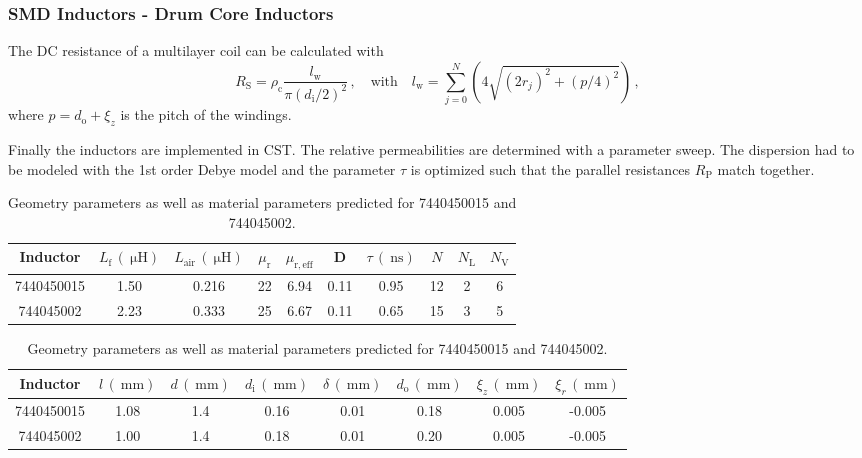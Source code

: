 \begin{frame}
	\frametitle{SMD Inductors - Drum Core Inductors}
	The DC resistance of a multilayer coil can be calculated with
	\begin{equation} \label{eqn:multilayer_eqn4}
		R_\mathrm{S} = \rho_\mathrm{c}\frac{l_\mathrm{w}}{\pi(d_\mathrm{i}/2)^2}\,, 
		\quad \text{with} \quad
		l_\mathrm{w} = \sum_{j=0}^{N}\left(4\sqrt{(2r_j)^2+(p/4)^2}\right)\,,
	\end{equation}
	where $p = d_\mathrm{o}+\xi_z$ is the pitch of the windings.
	
	Finally the inductors are implemented in CST. The relative permeabilities are determined with a parameter sweep. The dispersion had to be modeled with the 1st order Debye model and the parameter $\tau$ is optimized such that the parallel resistances $R_\mathrm{P}$ match together.
	\vspace{-15pt}
	\begin{table}[ptbh]
		\centering
		\begin{tabular}{|c|c c c c c c c c c|}
			\hline
			Inductor & $L_\mathrm{f}\,(\SI{}{\micro\henry})$ & $L_{\mathrm{air}}\,(\SI{}{\micro\henry})$ & $\mu_\mathrm{r}$ & $\mu_\mathrm{r,eff}$ & D & $\tau\,(\SI{}{\nano\second})$ & $N$ & $N_\mathrm{L}$ & $N_\mathrm{V}$\\
			\hline
			7440450015 & 1.50 & 0.216 & 22 & 6.94 & 0.11 & 0.95  & 12 & 2 & 6\\
			744045002 & 2.23 & 0.333 & 25 & 6.67 & 0.11 & 0.65  & 15 & 3 & 5\\
			\hline
		\end{tabular}
		\begin{tabular}{|c| c c c c c c c|}
			\hline
			Inductor & $l\,(\SI{}{\milli\meter})$ & $d\,(\SI{}{\milli\meter})$ & $d_\mathrm{i}\,(\SI{}{\milli\meter})$ & $\delta\,(\SI{}{\milli\meter})$ & $d_\mathrm{o}\,(\SI{}{\milli\meter})$ & $\xi_z\,(\SI{}{\milli\meter})$ & $\xi_r\,(\SI{}{\milli\meter})$\\
			\hline
			7440450015 & 1.08 & 1.4 & 0.16 & 0.01 & 0.18 & 0.005 & -0.005 \\
			744045002 & 1.00 & 1.4 & 0.18 & 0.01 & 0.20 & 0.005  & -0.005 \\
			\hline
		\end{tabular}
		\caption{Geometry parameters as well as material parameters predicted for 7440450015 and 744045002.}
		\label{tab:drum_core_result}
	\end{table}
\end{frame}

